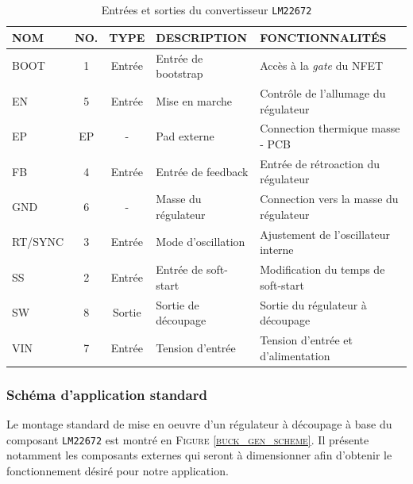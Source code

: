 			\begin{table}[h]
				\begin{center}
					\begin{tabular}{|l|c|c|l|l|}
					\hline
					\textbf{NOM}	& \textbf{NO.}	& \textbf{TYPE}	& \textbf{DESCRIPTION}	& \textbf{FONCTIONNALITÉS} \\
					\hline										
					BOOT			&	1			& 	Entrée		& 	Entrée de bootstrap	&	Accès à la
																								\textit{gate} du NFET	\\
					EN				&	5			&	Entrée		& 	Mise en marche		& 	Contrôle de
																								l'allumage du régulateur\\
					EP				& 	EP			&	-			&	Pad externe			& 	Connection thermique 
																								masse - PCB 			\\
					FB				&	4			&	Entrée		&	Entrée de feedback	&	Entrée de rétroaction
																								du régulateur			\\
					GND				&	6			&	-			&	Masse du régulateur	&	Connection vers la masse 
																								du régulateur			\\
					RT/SYNC			&	3			&	Entrée		&	Mode d'oscillation	&	Ajustement de
																								l'oscillateur interne	\\
					SS				&	2			&	Entrée		&	Entrée de soft-start&	Modification du temps
																								de soft-start			\\
					SW				&	8			&	Sortie		&	Sortie de découpage	&	Sortie du régulateur à
																								découpage				\\	
					VIN				&	7			&	Entrée		&	Tension d'entrée	&	Tension d'entrée et
																								d'alimentation			\\
					\hline
				\end{tabular}				
				\end{center}	
				\caption{Entrées et sorties du convertisseur \texttt{LM22672} \cite{LM22672}}
				\label{io_lm22672}
			\end{table}
			
			\subsubsection{Schéma d'application standard}
				
			Le montage standard de mise en oeuvre d'un régulateur à découpage
			à base du composant \texttt{LM22672} est montré en 
			\textsc{Figure \ref{buck_gen_scheme}}. Il présente notamment les
			composants externes qui seront à dimensionner afin d'obtenir le
			fonctionnement désiré pour notre application.
			
